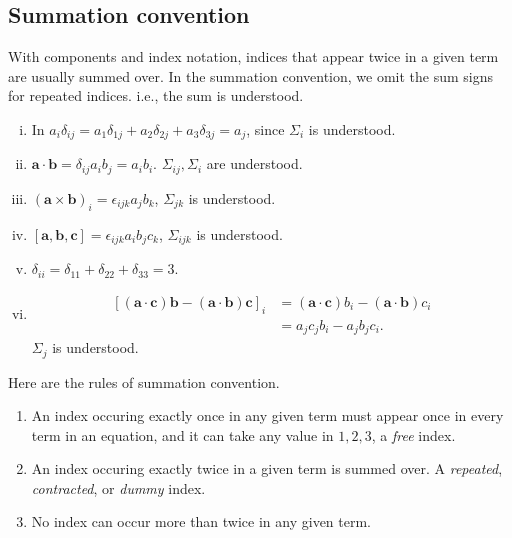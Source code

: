 \documentclass[10pt]{article}
\begin{document}
    \subsection{Summation convention}
    With components and index notation, indices that appear twice in a given term are usually summed over. In the summation convention, we omit the sum signs for repeated indices. i.e., the sum is understood.
    \begin{example}
        \begin{enumerate}[(i)]
            \item In $ a_i \delta_{ij} = a_1\delta_{1j}+a_2\delta_{2j}+a_3 \delta_{3j}=a_j $, since $ \Sigma_{i} $ is understood.
            \item $ \mathbf{a}\cdot \mathbf{b}=\delta_{ij}a_{i}b_{j}=a_ib_i $. $ \Sigma_{ij}, \Sigma_{i} $ are understood.
            \item $ (\mathbf{a}\times \mathbf{b})_i=\epsilon_{ijk}a_jb_k $, $ \Sigma_{jk} $ is understood.
            \item $ [\mathbf{a},\mathbf{b},\mathbf{c}]=\epsilon_{ijk}a_ib_jc_k $, $ \Sigma_{ijk} $ is understood.
            \item $ \delta_{ii}=\delta_{11}+\delta_{22}+\delta_{33}=3 $.
            \item 
            \[
                \begin{aligned}
                    [(\mathbf{a}\cdot \mathbf{c})\mathbf{b}-(\mathbf{a}\cdot \mathbf{b})\mathbf{c}]_i&=(\mathbf{a}\cdot \mathbf{c})b_i-(\mathbf{a}\cdot \mathbf{b})c_i\\
                    &= a_jc_jb_i-a_jb_jc_i.
                \end{aligned}
            \]
            $ \Sigma_j $ is understood.
        \end{enumerate}
    \end{example}
    Here are the rules of summation convention.
    \begin{enumerate}[(1)]
        \item An index occuring exactly once in any given term must appear once in every term in an equation, and it can take any value in $ 1,2,3 $, a \textit{free} index.
        \item An index occuring exactly twice in a given term is summed over. A \textit{repeated}, \textit{contracted}, or \textit{dummy} index.
        \item No index can occur more than twice in any given term.
    \end{enumerate}
\end{document}
